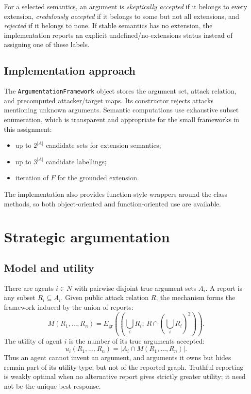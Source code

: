 \documentclass[11pt,a4paper]{article}
\newcommand{\Grounded}{E_{\mathrm{gr}}}
\newcommand{\code}[1]{\texttt{\small #1}}
\begin{document}
For a selected semantics, an argument is \emph{skeptically accepted} if it belongs to every extension, \emph{credulously accepted} if it belongs to some but not all extensions, and \emph{rejected} if it belongs to none. If stable semantics has no extension, the implementation reports an explicit undefined/no-extensions status instead of assigning one of these labels.

\subsection{Implementation approach}
The \code{ArgumentationFramework} object stores the argument set, attack relation, and precomputed attacker/target maps. Its constructor rejects attacks mentioning unknown arguments. Semantic computations use exhaustive subset enumeration, which is transparent and appropriate for the small frameworks in this assignment:
\begin{itemize}
\item up to $2^{|A|}$ candidate sets for extension semantics;
\item up to $3^{|A|}$ candidate labellings;
\item iteration of $F$ for the grounded extension.
\end{itemize}
The implementation also provides function-style wrappers around the class methods, so both object-oriented and function-oriented use are available.

\section{Strategic argumentation}

\subsection{Model and utility}
There are agents $i\in N$ with pairwise disjoint true argument sets $A_i$. A report is any subset $R_i\subseteq A_i$. Given public attack relation $R$, the mechanism forms the framework induced by the union of reports:
\[
M(R_1,\ldots,R_n)=
\Grounded\left(
\left(\bigcup_i R_i,\ R\cap\left(\bigcup_iR_i\right)^2\right)
\right).
\]
The utility of agent $i$ is the number of its true arguments accepted:
\[
u_i(R_1,\ldots,R_n)=|A_i\cap M(R_1,\ldots,R_n)|.
\]
Thus an agent cannot invent an argument, and arguments it owns but hides remain part of its utility type, but not of the reported graph. Truthful reporting is weakly optimal when no alternative report gives strictly greater utility; it need not be the unique best response.
\end{document}
